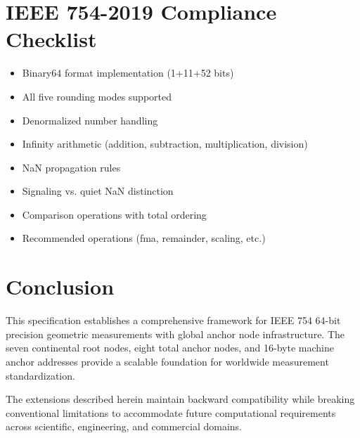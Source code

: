 \documentclass[12pt]{book}
\begin{document}
\chapter{IEEE 754-2019 Compliance Checklist}

\begin{itemize}
\item Binary64 format implementation (1+11+52 bits)
\item All five rounding modes supported
\item Denormalized number handling
\item Infinity arithmetic (addition, subtraction, multiplication, division)
\item NaN propagation rules
\item Signaling vs. quiet NaN distinction
\item Comparison operations with total ordering
\item Recommended operations (fma, remainder, scaling, etc.)
\end{itemize}

\backmatter

\chapter*{Conclusion}

This specification establishes a comprehensive framework for IEEE 754 64-bit precision geometric measurements with global anchor node infrastructure. The seven continental root nodes, eight total anchor nodes, and 16-byte machine anchor addresses provide a scalable foundation for worldwide measurement standardization.

The extensions described herein maintain backward compatibility while breaking conventional limitations to accommodate future computational requirements across scientific, engineering, and commercial domains.
\end{document}

